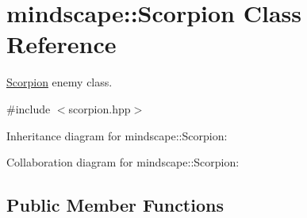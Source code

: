 \hypertarget{classmindscape_1_1_scorpion}{}\section{mindscape\+:\+:Scorpion Class Reference}
\label{classmindscape_1_1_scorpion}


\hyperlink{classmindscape_1_1_scorpion}{Scorpion} enemy class.  




{\ttfamily \#include $<$scorpion.\+hpp$>$}



Inheritance diagram for mindscape\+:\+:Scorpion\+:


Collaboration diagram for mindscape\+:\+:Scorpion\+:
\subsection*{Public Member Functions}
